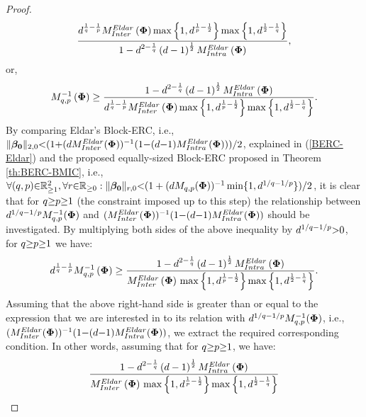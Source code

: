 \begin{proof}
\begin{gather*}
{\frac{d^{\frac1q - \frac1p} M^{Eldar}_{Inter}\left( \boldsymbol{\Phi}\right) \max \left\lbrace 1 , d^{\frac1p - \frac{1}{2}} \right\rbrace \max \left\lbrace 1 , d^{\frac{1}{2} - \frac1q} \right\rbrace}{1-  d^{2 - \frac1q} \left( d - 1 \right)^\frac12 M^{Eldar}_{Intra}\left( \boldsymbol{\Phi}\right)},}
\end{gather*}
or,
\begin{gather*}
M_{q,p}^{-1}\left( \boldsymbol{\Phi} \right) \geq 
\frac{1-  d^{2 - \frac1q} \left( d - 1 \right)^\frac12 M^{Eldar}_{Intra}\left( \boldsymbol{\Phi} \right)}{d^{\frac1q - \frac1p} M^{Eldar}_{Inter}\left( \boldsymbol{\Phi} \right) \max \left\lbrace 1 , d^{\frac1p - \frac{1}{2}} \right\rbrace \max \left\lbrace 1 , d^{\frac{1}{2} - \frac1q} \right\rbrace}.
\end{gather*}
By comparing Eldar's Block-ERC, i.e., $\Vert \boldsymbol{\beta_0} \Vert_{2,0} {<} (1 {+} (d M^{Eldar}_{Inter}(\boldsymbol{\Phi}))^{-1} (1 {-} (d {-} 1)M^{Eldar}_{Intra}(\boldsymbol{\Phi})))/2$, explained in (\ref{BERC-Eldar}) and the proposed equally-sized Block-ERC proposed in Theorem \ref{th:BERC-BMIC}, i.e., $\forall (q,p) {\in} \mathbb{R}^2_{{\geq} 1}, \forall r {\in} \mathbb{R}_{{\geq} 0} : \Vert \boldsymbol{\beta_0} \Vert_{r,0} {<} ( 1 + (dM_{q,p}(\boldsymbol{\Phi}))^{-1} \min \{1 , d^{1/q {-} 1/p} \}) / 2 $, it is clear that for $q {\geq} p {\geq} 1$ (the constraint imposed up to this step) the relationship between $d^{1/q {-} 1/p} M_{q,p}^{-1}(\boldsymbol{\Phi})$ 
and $(M^{Eldar}_{Inter}(\boldsymbol{\Phi}))^{-1} (1 {-} (d {-} 1)M^{Eldar}_{Intra}(\boldsymbol{\Phi}))$ should be investigated.
By multiplying both sides of the above inequality by $d^{1/q {-} 1/p} {>} 0$, for $q {\geq} p {\geq} 1$ we have:
\begin{gather*}
d^{\frac1q - \frac1p} M_{q,p}^{-1}\left( \boldsymbol{\Phi} \right) \geq 
\frac{1-  d^{2 - \frac1q} \left( d - 1 \right)^\frac12 M^{Eldar}_{Intra}\left( \boldsymbol{\Phi} \right)}{M^{Eldar}_{Inter}\left( \boldsymbol{\Phi} \right) \, \max \left\lbrace 1 , d^{\frac1p - \frac{1}{2}} \right\rbrace \max \left\lbrace 1 , d^{\frac{1}{2} - \frac1q} \right\rbrace}.
\end{gather*}
Assuming that the above right-hand side is greater than or equal to the expression that we are interested in to its relation with $d^{1/q {-} 1/p} M_{q,p}^{-1}(\boldsymbol{\Phi})$, i.e., $(M^{Eldar}_{Inter}(\boldsymbol{\Phi}))^{-1} (1 {-} (d {-} 1)M^{Eldar}_{Intra}(\boldsymbol{\Phi}))$, we extract the required corresponding condition.
In other words, assuming that for $q {\geq} p {\geq} 1$, we have:
\begin{gather*} 
\frac{1-  d^{2 - \frac1q} \myparanthese{d - 1}^\frac12 M^{Eldar}_{Intra}\myparanthese{\myPhi}}{M^{Eldar}_{Inter}\myparanthese{\myPhi} \, \max \mybrace{1 , d^{\frac1p - \frac{1}{2}}} \max \mybrace{1 , d^{\frac{1}{2} - \frac1q}}} 

\end{gather*}
\end{proof}
